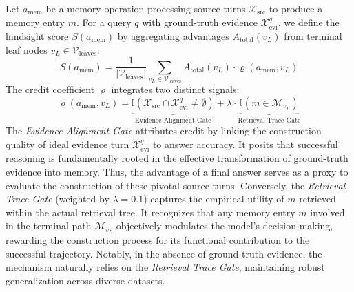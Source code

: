 \documentclass[11pt, a4paper]{lumia}
\begin{document}
Let $a_{\text{mem}}$ be a memory operation processing source turns $\mathcal{X}_{\text{src}}$ to produce a memory entry $m$. For a query $q$ with ground-truth evidence $\mathcal{X}_{\text{evi}}^{q}$, we define the hindsight score $S(a_{\text{mem}})$ by aggregating advantages $A_{\text{total}}(v_L)$ from terminal leaf nodes $v_L \in \mathcal{V}_{\text{leaves}}$:
\begin{equation}
S(a_{\text{mem}}) = \frac{1}{|\mathcal{V}_{\text{leaves}}|} \sum_{v_L \in \mathcal{V}_{\text{leaves}}} A_{\text{total}}(v_L) \cdot \varrho(a_{\text{mem}}, v_L)
\end{equation}
The credit coefficient $\varrho$ integrates two distinct signals:
\begin{equation}
\varrho(a_{\text{mem}}, v_L) = \underbrace{\mathbb{I}(\mathcal{X}_{\text{src}} \cap \mathcal{X}_{\text{evi}}^{q} \neq \emptyset)}_{\text{Evidence Alignment Gate}} + \lambda \cdot \underbrace{\mathbb{I}(m \in \mathcal{M}_{v_L})}_{\text{Retrieval Trace Gate}}
\end{equation}
The \textit{Evidence Alignment Gate} attributes credit by linking the construction quality of ideal evidence turn $\mathcal{X}_{\text{evi}}^{q}$ to answer accuracy. It posits that successful reasoning is fundamentally rooted in the effective transformation of ground-truth evidence into memory. Thus, the advantage of a final answer serves as a proxy to evaluate the construction of these pivotal source turns. Conversely, the \textit{Retrieval Trace Gate} (weighted by $\lambda=0.1$) captures the empirical utility of $m$ retrieved within the actual retrieval tree. It recognizes that any memory entry $m$ involved in the terminal path $\mathcal{M}_{v_L}$ objectively modulates the model's decision-making, rewarding the construction process for its functional contribution to the successful trajectory. Notably, in the absence of ground-truth evidence, the mechanism naturally relies on the \textit{Retrieval Trace Gate}, maintaining robust generalization across diverse datasets.
\end{document}

